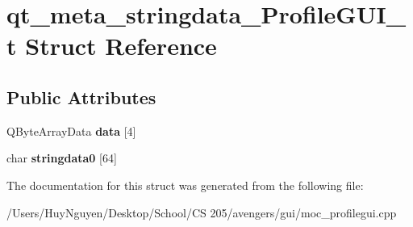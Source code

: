 \hypertarget{structqt__meta__stringdata__ProfileGUI__t}{}\section{qt\+\_\+meta\+\_\+stringdata\+\_\+\+Profile\+G\+U\+I\+\_\+t Struct Reference}
\label{structqt__meta__stringdata__ProfileGUI__t}
\subsection*{Public Attributes}
\begin{DoxyCompactItemize}
\item 
Q\+Byte\+Array\+Data {\bfseries data} \mbox{[}4\mbox{]}\hypertarget{structqt__meta__stringdata__ProfileGUI__t_a81b3e9c608f05c6e4d40b39f3d74a829}{}\label{structqt__meta__stringdata__ProfileGUI__t_a81b3e9c608f05c6e4d40b39f3d74a829}

\item 
char {\bfseries stringdata0} \mbox{[}64\mbox{]}\hypertarget{structqt__meta__stringdata__ProfileGUI__t_a5182e37c62e923406f15d23154190a92}{}\label{structqt__meta__stringdata__ProfileGUI__t_a5182e37c62e923406f15d23154190a92}

\end{DoxyCompactItemize}


The documentation for this struct was generated from the following file\+:\begin{DoxyCompactItemize}
\item 
/\+Users/\+Huy\+Nguyen/\+Desktop/\+School/\+C\+S 205/avengers/gui/moc\+\_\+profilegui.\+cpp\end{DoxyCompactItemize}
